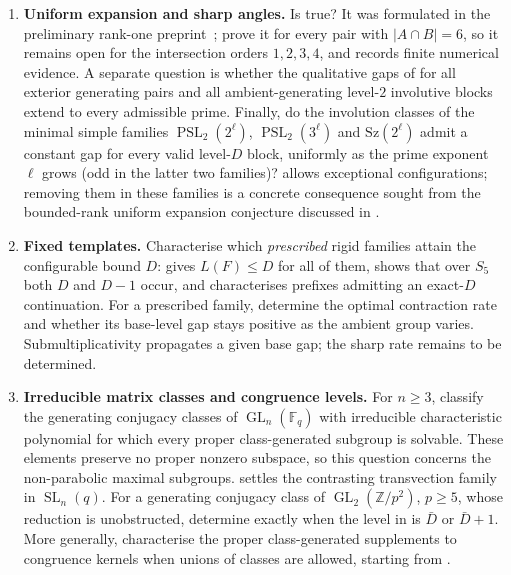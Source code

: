 \documentclass[11pt]{amsart}
\theoremstyle{definition}
\theoremstyle{remark}
\theoremstyle{plain}
\theoremstyle{plain}
\numberwithin{equation}{section}
\DeclareMathOperator{\GL}{GL}
\DeclareMathOperator{\SL}{SL}
\DeclareMathOperator{\PSL}{PSL}
\newcommand{\F}{\mathbb{F}}
\newcommand{\Z}{\mathbb{Z}}
\begin{document}
\begin{enumerate}[nosep,leftmargin=1.4em]
\item \textbf{Uniform expansion and sharp angles.}
  Is  true? It was formulated in the preliminary
  rank-one preprint~\cite[Conjecture 6.9]{ZermenoRankOneZenodo};
   prove it for every
  pair with $|A\cap B|=6$, so it remains open for the intersection
  orders $1,2,3,4$, and  records finite
  numerical evidence.
  A separate question is whether the qualitative gaps of
   for all exterior generating pairs and
  all ambient-generating level-$2$ involutive blocks extend to every
  admissible prime.
  Finally, do the involution classes of the minimal simple families
  $\PSL_2(2^\ell)$, $\PSL_2(3^\ell)$ and $\mathrm{Sz}(2^\ell)$
  admit a constant gap for every valid level-$D$ block, uniformly as
  the prime exponent $\ell$ grows (odd in the latter two families)?
   allows exceptional configurations;
  removing them in these families is a concrete consequence sought
  from the bounded-rank uniform expansion conjecture discussed in
  \cite[Introduction]{BeckerBreuillard2026}.
\item \textbf{Fixed templates.} Characterise which \emph{prescribed} rigid families attain the
  configurable bound $D$:  gives $L(F)\le D$ for all of them,
   shows that over $S_5$ both $D$ and $D-1$ occur, and
   characterises prefixes admitting an exact-$D$
  continuation. For a prescribed family, determine the optimal contraction
  rate and whether its base-level gap stays positive as the ambient group
  varies. Submultiplicativity propagates a given base gap; the sharp rate
  remains to be determined.
\item \textbf{Irreducible matrix classes and congruence levels.}
  For $n\ge3$, classify the generating conjugacy classes of
  $\GL_n(\F_q)$ with irreducible characteristic polynomial for which
  every proper class-generated subgroup is solvable. These elements
  preserve no proper nonzero subspace, so this question concerns the
  non-parabolic maximal subgroups. 
  settles the contrasting transvection family in $\SL_n(q)$.
  For a generating conjugacy class of $\GL_2(\Z/p^2)$, $p\ge5$,
  whose reduction is unobstructed, determine exactly when the level
  in  is $\bar D$ or $\bar D+1$.
  More generally, characterise the proper class-generated supplements
  to congruence kernels when unions of classes are allowed, starting
  from .
\end{enumerate}
\end{document}
